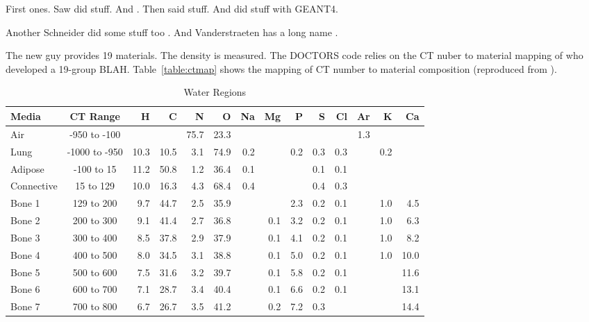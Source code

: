 First ones.
Saw \citep{ref:sawc} did stuff. And \citep{ref:plessisf}. Then \citet{ref:schneideru} said stuff. And \citet{ref:kimh} did stuff with GEANT4.

Another Schneider did some stuff too \citep{ref:schneiderw}. And Vanderstraeten has a long name \citep{ref:vanderstraetenb}.

The new guy provides 19 materials. The density is measured.
The DOCTORS code relies on the CT nuber to material mapping of \citet{ref:ottossonr} who developed a 19-group BLAH. Table~\ref{table:ctmap} shows the mapping of CT number to material composition (reproduced from \citep{ref:ottossonr}).

\begin{sidewaystable}[ht]
\caption{Water Regions}
\centering 
\begin{tabular}{l c r r r r r r r r r r r r}
\hline \hline   
Media       & CT Range      & H    & C    & N    & O    & Na  & Mg  & P    & S   & Cl  & Ar  & K   & Ca \\ [0.5ex] 
\hline
Air         & -950 to -100  &      &      & 75.7 & 23.3 &     &     &      &     &     & 1.3 &     &      \\
Lung        & -1000 to -950 & 10.3 & 10.5 &  3.1 & 74.9 & 0.2 &     &  0.2 & 0.3 & 0.3 &     & 0.2 &      \\
Adipose     & -100 to 15    & 11.2 & 50.8 &  1.2 & 36.4 & 0.1 &     &      & 0.1 & 0.1 &     &     &      \\
Connective  & 15 to 129     & 10.0 & 16.3 &  4.3 & 68.4 & 0.4 &     &      & 0.4 & 0.3 &     &     &      \\
Bone 1      & 129 to 200    &  9.7 & 44.7 &  2.5 & 35.9 &     &     &  2.3 & 0.2 & 0.1 &     & 1.0 &  4.5 \\ 
Bone 2      & 200 to 300    &  9.1 & 41.4 &  2.7 & 36.8 &     & 0.1 &  3.2 & 0.2 & 0.1 &     & 1.0 &  6.3 \\ 
Bone 3      & 300 to 400    &  8.5 & 37.8 &  2.9 & 37.9 &     & 0.1 &  4.1 & 0.2 & 0.1 &     & 1.0 &  8.2 \\ 
Bone 4      & 400 to 500    &  8.0 & 34.5 &  3.1 & 38.8 &     & 0.1 &  5.0 & 0.2 & 0.1 &     & 1.0 & 10.0 \\ 
Bone 5      & 500 to 600    &  7.5 & 31.6 &  3.2 & 39.7 &     & 0.1 &  5.8 & 0.2 & 0.1 &     &     & 11.6 \\ 
Bone 6      & 600 to 700    &  7.1 & 28.7 &  3.4 & 40.4 &     & 0.1 &  6.6 & 0.2 & 0.1 &     &     & 13.1 \\ 
Bone 7      & 700 to 800    &  6.7 & 26.7 &  3.5 & 41.2 &     & 0.2 &  7.2 & 0.3 &     &     &     & 14.4 \\ 

\end{tabular}
\end{sidewaystable}
